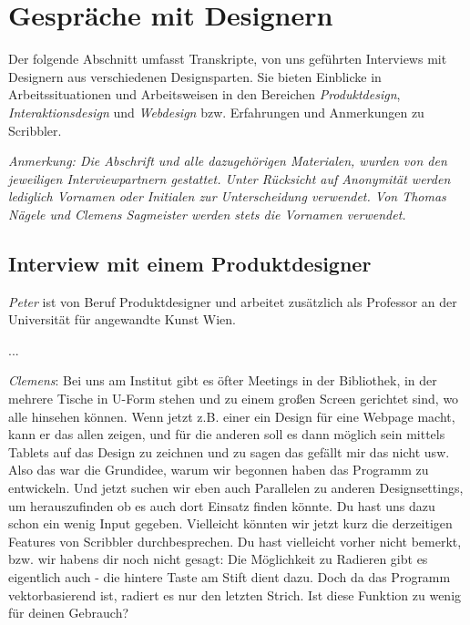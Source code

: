 \chapter{Gespr{\"a}che mit Designern}
Der folgende Abschnitt umfasst Transkripte, von uns geführten Interviews mit Designern aus verschiedenen Designsparten. Sie bieten Einblicke in Arbeitssituationen und Arbeitsweisen in den Bereichen \emph{Produktdesign}, \emph{Interaktionsdesign} und \emph{Webdesign} bzw. Erfahrungen und Anmerkungen zu Scribbler.

\medskip \emph{Anmerkung: Die Abschrift und alle dazugehörigen Materialen, wurden von den jeweiligen Interviewpartnern gestattet. Unter Rücksicht auf Anonymität werden lediglich Vornamen oder Initialen zur Unterscheidung verwendet. Von Thomas Nägele und Clemens Sagmeister werden stets die Vornamen verwendet.}

\section{Interview mit einem Produktdesigner}
\emph{Peter} ist von Beruf Produktdesigner und arbeitet zusätzlich als Professor an der Universität für angewandte Kunst Wien. 

\par...
\par \medskip \emph{Clemens}: Bei uns am Institut gibt es öfter Meetings in der Bibliothek, in der mehrere Tische in U-Form stehen und zu einem großen Screen gerichtet sind, wo alle hinsehen können. Wenn jetzt z.B. einer ein Design für eine Webpage macht, kann er das allen zeigen, und für die anderen soll es dann möglich sein mittels Tablets auf das Design zu zeichnen und zu sagen das gefällt mir das nicht usw. Also das war die Grundidee, warum wir begonnen haben das Programm zu entwickeln. Und jetzt suchen wir eben auch Parallelen zu anderen Designsettings, um herauszufinden ob es auch dort Einsatz finden könnte. Du hast uns dazu schon ein wenig Input gegeben. Vielleicht könnten wir jetzt kurz die derzeitigen Features von Scribbler durchbesprechen. Du hast vielleicht vorher nicht bemerkt, bzw. wir habens dir noch nicht gesagt: Die Möglichkeit zu Radieren gibt es eigentlich auch - die hintere Taste am Stift dient dazu. Doch da das Programm vektorbasierend ist, radiert es nur den letzten Strich. Ist diese Funktion zu wenig für deinen Gebrauch?

